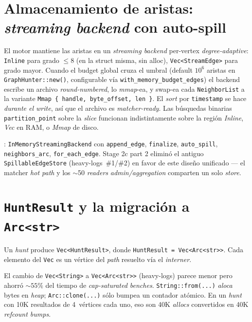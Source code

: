 \section{Almacenamiento de aristas: \emph{streaming backend} con auto-spill}

El motor mantiene las aristas en un \emph{streaming backend}
per-vertex \emph{degree-adaptive}: \texttt{Inline} para grado $\leq 8$
(en la struct misma, sin alloc), \texttt{Vec<StreamEdge>} para grado
mayor. Cuando el budget global cruza el umbral
(default $10^6$ aristas en \texttt{GraphHunter::new()},
configurable vía \texttt{with\_memory\_budget\_edges}) el backend
escribe un archivo \emph{round-numbered}, lo \emph{mmap}-ea, y
swap-ea cada \texttt{NeighborList} a la variante \texttt{Mmap \{ handle,
byte\_offset, len \}}. El \emph{sort} por \texttt{timestamp} se hace
\emph{durante el write}, así que el archivo es \emph{matcher-ready}.
Las búsquedas binarias \texttt{partition\_point} sobre la \emph{slice}
funcionan indistintamente sobre la región \emph{Inline}, \emph{Vec}
en RAM, o \emph{Mmap} de disco.

\begin{enelcodigo}
:
\texttt{InMemoryStreamingBackend} con \texttt{append\_edge},
\texttt{finalize}, \texttt{auto\_spill}, \texttt{neighbors\_arc},
\texttt{for\_each\_edge}. Stage 2c part 2 eliminó el antiguo
\texttt{SpillableEdgeStore} (heavy-logs~\#1/\#2) en favor de este
diseño unificado --- el matcher \emph{hot path} y los $\sim$50
\emph{readers} \emph{admin/aggregation} comparten un solo \emph{store}.
\end{enelcodigo}

\section{\texttt{HuntResult} y la migración a \texttt{Arc<str>}}

Un \emph{hunt} produce \texttt{Vec<HuntResult>}, donde
\texttt{HuntResult = Vec<Arc<str>>}. Cada elemento del \texttt{Vec}
es un vértice del \emph{path} resuelto vía el \emph{interner}.

\begin{intuicion}
El cambio de \texttt{Vec<String>} a \texttt{Vec<Arc<str>>} (heavy-logs)
parece menor pero ahorró $\sim 55\%$ del tiempo de \emph{cap-saturated
benches}. \texttt{String::from(...)} \emph{aloca} bytes en \emph{heap};
\texttt{Arc::clone(...)} sólo bumpea un contador atómico. En un
\emph{hunt} con 10K resultados de 4~vértices cada uno, eso son 40K
\emph{allocs} convertidos en 40K \emph{refcount bumps}.
\end{intuicion}

